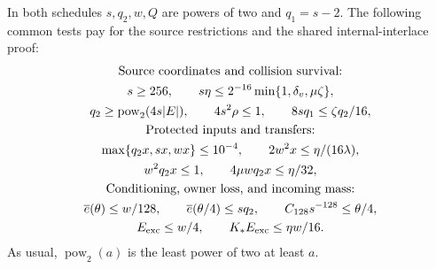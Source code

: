\documentclass[11pt]{article} \usepackage[utf8]{inputenc}
\theoremstyle{plain} \newtheorem{theorem}{Theorem}[section]
\theoremstyle{definition} \newaliascnt{definition}{theorem}
\begin{document}
In both schedules $s,q_2,w,Q$ are powers of two and $q_1=s-2$.
The following common tests pay for the source restrictions and the shared
internal-interlace proof:
\begin{equation}\label{eq:width-margins}
\begin{gathered}
 \text{Source coordinates and collision survival:}\\
 s\ge256,\qquad
 s\eta\le2^{-16}\min\{1,\delta_v,\mu\zeta\},\\
 q_2\ge\operatorname{pow}_2(4s|E|),\qquad
 4s^2\rho\le1,\qquad 8sq_1\le\zeta q_2/16,\\
 \text{Protected inputs and transfers:}\\
 \max\{q_2x,sx,wx\}\le10^{-4},\qquad
 2w^2x\le\eta/(16\lambda),\\
 w^2q_2x\le1,\qquad 4\mu wq_2x\le\eta/32,\\
 \text{Conditioning, owner loss, and incoming mass:}\\
 \overline e(\theta)\le w/128,\qquad
 \overline e(\theta/4)\le sq_2,\qquad
 C_{128}s^{-128}\le\theta/4,\\
 E_{\rm exc}\le w/4,\qquad K_*E_{\rm exc}\le\eta w/16.
\end{gathered}
\end{equation}
As usual, $\operatorname{pow}_2(a)$ is the least power of two at least $a$.
\end{document}
